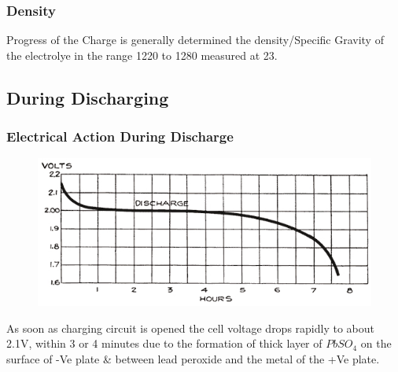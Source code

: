 \documentclass{beamer}
\begin{document}
  \begin{frame}   %
  \frametitle{Density}
    \begin{center}
      Progress of the Charge is generally determined the density/Specific Gravity of the electrolye in the range 1220 to 1280 measured at 23\textcelsius.
    \end{center}
  \end{frame}


\subsection{During Discharging}

  \begin{frame}    %
    \frametitle{Electrical Action During Discharge}
    \begin{figure}
      \includegraphics[width=0.8\linewidth]{./Resources/Images/voltage_during_discharge.jpg}
    \end{figure}
    As soon as charging circuit is opened the cell voltage drops rapidly to about 2.1V, within
    3 or 4 minutes due to the formation of thick layer of $PbSO_{4}$ on the surface of -Ve plate
    \& between lead peroxide and the metal of the +Ve plate.
  \end{frame}
\end{document}
